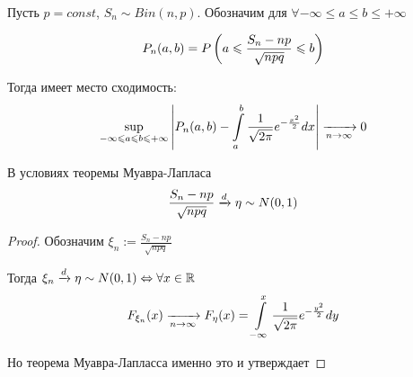 \begin{theorem}~

  Пусть $p = const$, $S_n \sim Bin(n, p)$. 
  Обозначим для $\forall -\infty \leq a \leq b \leq +\infty$

  \begin{align*}
    P_n (a, b) = P\left( a \leqslant \frac{S_n - np}{\sqrt{npq}} \leqslant b \right)
  \end{align*}

  Тогда имеет место сходимость:
  \begin{align*}
    \sup_{-\infty \leqslant a \leqslant b \leqslant +\infty} 
      \left | P_n(a, b) - \int\limits_{a}^{b} \frac{1}{\sqrt{2\pi}} e^{-\frac{x^2}{2}} dx \right | 
      \xrightarrow[n \to \infty]{} 0
  \end{align*}
\end{theorem}

\begin{corollary}
  В условиях теоремы Муавра-Лапласа
  \begin{align*}
    \frac{S_n - np}{\sqrt{npq}} \xrightarrow{d} \eta \sim N(0, 1)
  \end{align*}

  \begin{proof}
    Обозначим $\xi_n := \frac{S_n - np}{\sqrt{npq}}$

    Тогда $\xi_n \xrightarrow{d} \eta \sim N(0, 1) \Leftrightarrow \forall x \in \mathbb{R}$
    \begin{align*}
      F_{\xi_n} (x) \xrightarrow[n \to \infty]{} F_{\eta} (x) 
      = \int\limits_{-\infty}^{x} \frac{1}{\sqrt{2\pi}} e^{-\frac{y^2}{2}} dy
    \end{align*}

    Но теорема Муавра-Лапласса именно это и утверждает
  \end{proof}
\end{corollary}

